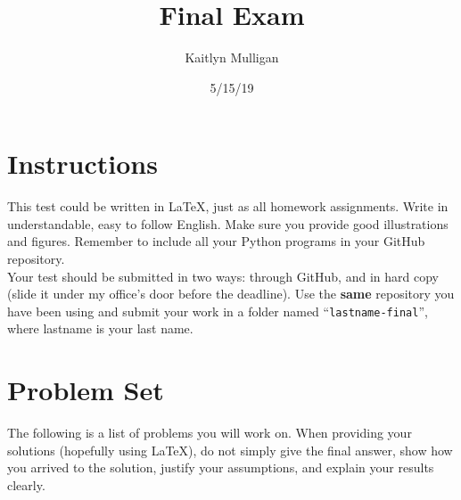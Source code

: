 \documentclass[a4paper]{article}
\title{Final Exam}
\author{Kaitlyn Mulligan}
\date{5/15/19}
\newcommand\tab[1][0.5cm]{\hspace*{#1}}
\begin{document}
\lstset{language=Python}

\maketitle

\section{Instructions}
This test could be written in \LaTeX, just as all homework assignments.  Write in understandable, 
easy to follow English.  Make sure you provide good illustrations and figures.  Remember to 
include all your Python programs in your GitHub repository.\\
\tab Your test should be submitted in two ways: through GitHub, and in hard copy (slide it under 
my office's door before the deadline).  Use the \textbf{same} repository you have been using and 
submit your work in a folder named ``\verb|lastname-final|'', where lastname is your last name.


\section{Problem Set}
The following is a list of problems you will work on.  When providing your solutions (hopefully 
using \LaTeX), do not simply give the final answer, show how you arrived to the solution, justify 
your assumptions, and explain your results clearly.

\end{document}
